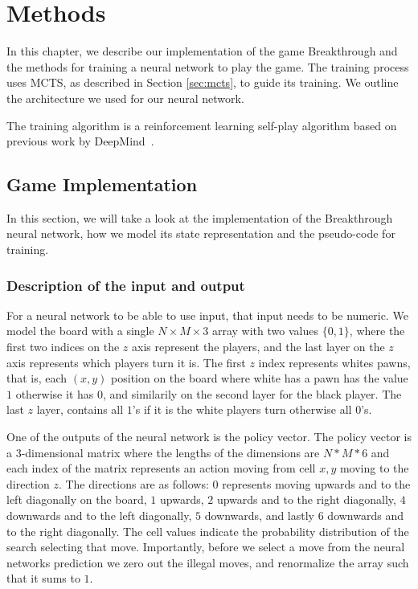 \chapter{Methods}

\label{cha:methods}

In this chapter, we describe our implementation of the game Breakthrough and the methods for training a neural network to play the game. The training process uses MCTS, as described in Section \ref{sec:mcts}, to guide its training. We outline the architecture we used for our neural network.

The training algorithm is a reinforcement learning self-play algorithm based on previous work by DeepMind~\cite{silver:alphagozero}.

\section{Game Implementation}

In this section, we will take a look at the implementation of the Breakthrough neural network, how we model its state representation and the pseudo-code for training.

\subsection{Description of the input and output}

For a neural network to be able to use input, that input needs to be numeric. We model the board with a single $N\times M\times 3$ array with two values $\{0,1\}$, where the first two indices on the $z$ axis represent the players, and the last layer on the $z$ axis represents which players turn it is. The first $z$ index represents whites pawns, that is, each $(x,y)$ position on the board where white has a pawn has the value $1$ otherwise it has $0$, and similarily on the second layer for the black player. The last $z$ layer, contains all $1$'s if it is the white players turn otherwise all $0$'s.

One of the outputs of the neural network is the policy vector. The policy vector is a $3$-dimensional matrix where the lengths of the dimensions are $N * M * 6$ and each index of the matrix represents an action moving from cell $x,y$ moving to the direction $z$. The directions are as follows: $0$ represents moving upwards and to the left diagonally on the board, $1$ upwards, $2$ upwards and to the right diagonally, $4$ downwards and to the left diagonally, $5$ downwards, and lastly $6$ downwards and to the right diagonally. The cell values indicate the probability distribution of the search selecting that move. Importantly, before we select a move from the neural networks prediction we zero out the illegal moves, and renormalize the array such that it sums to $1$.

